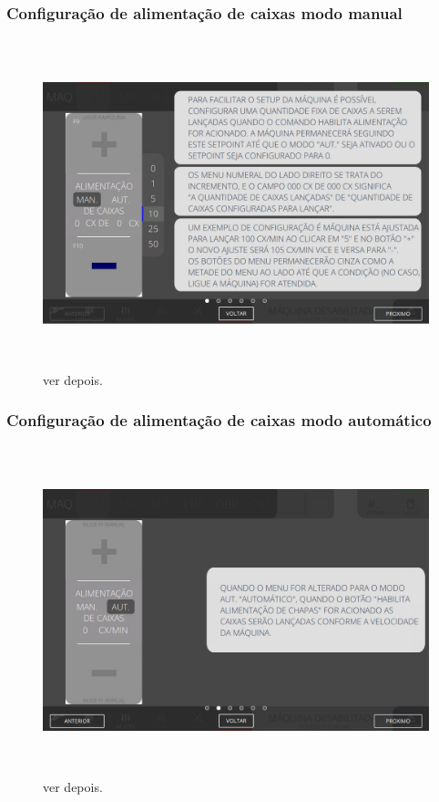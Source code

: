 \subsubsection{\small{Configuração de alimentação de caixas modo manual}}
\begin{figure}[h]
  \centering
  \includegraphics[width=576px,height=360px]{src/imagesFlexo/03-feeder/commands/e-1.png}
  \caption{ver depois.}
   \label{}
\end{figure}
\vspace*{\fill}


\newpage
\thispagestyle{fancy}
\vspace*{\fill}
\subsubsection{\small{Configuração de alimentação de caixas modo automático}}
\begin{figure}[h]
  \centering
  \includegraphics[width=576px,height=360px]{src/imagesFlexo/03-feeder/commands/e-2.png}
  \caption{ver depois.}
   \label{}
\end{figure}
\vspace*{\fill}

